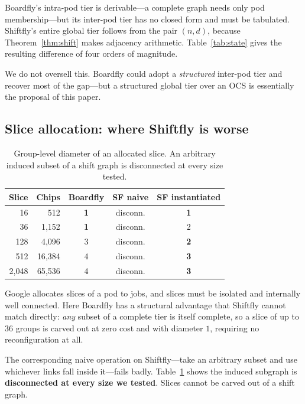 \documentclass[sigconf,nonacm]{acmart}
\theoremstyle{acmdefinition}%
\begin{document}
Boardfly's intra-pod tier is derivable---a complete graph needs only pod
membership---but its inter-pod tier has no closed form and must be tabulated.
Shiftfly's entire global tier follows from the pair $(n,d)$, because
Theorem~\ref{thm:shift} makes adjacency arithmetic. Table~\ref{tab:state} gives
the resulting difference of four orders of magnitude.

We do not oversell this. Boardfly could adopt a \emph{structured} inter-pod tier
and recover most of the gap---but a structured global tier over an OCS is
essentially the proposal of this paper.

\subsection{Slice allocation: where Shiftfly is worse}
\label{sec:slices}

\begin{table}[t]
\centering\small
\begin{tabular}{rrccc}
\toprule
Slice & Chips & Boardfly & SF naive & SF instantiated \\
\midrule
16 & 512 & \textbf{1} & disconn. & \textbf{1} \\
36 & 1{,}152 & \textbf{1} & disconn. & 2 \\
128 & 4{,}096 & 3 & disconn. & \textbf{2} \\
512 & 16{,}384 & 4 & disconn. & \textbf{3} \\
2{,}048 & 65{,}536 & 4 & disconn. & \textbf{3} \\
\bottomrule
\end{tabular}
\caption{Group-level diameter of an allocated slice. An arbitrary induced subset
of a shift graph is disconnected at every size tested.}
\label{tab:slices}
\end{table}

Google allocates slices of a pod to jobs, and slices must be isolated and
internally well connected. Here Boardfly has a structural advantage that
Shiftfly cannot match directly: \emph{any} subset of a complete tier is itself
complete, so a slice of up to $36$ groups is carved out at zero cost and with
diameter $1$, requiring no reconfiguration at all.

The corresponding naive operation on Shiftfly---take an arbitrary subset and use
whichever links fall inside it---fails badly. Table~\ref{tab:slices} shows the
induced subgraph is \textbf{disconnected at every size we tested}. Slices cannot
be carved out of a shift graph.
\end{document}
